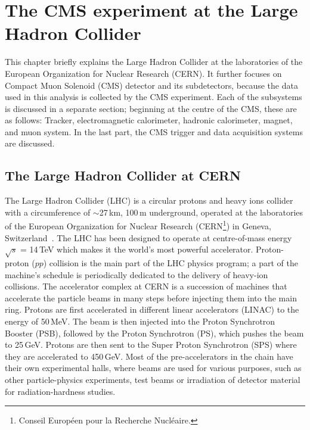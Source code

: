 \graphicspath{{chapt_dutch/}{intro/}{chapt2/}{chapt3/}{chapt4/}{chapt5/}{chapt6/}{chapt7/}{chapt8/}}

\renewcommand\evenpagerightmark{{\scshape\small Chapter 3}}
\renewcommand\oddpageleftmark{{\scshape\small LHC and the CMS Experiment}}

\renewcommand{\bibname}{References}

\hyphenation{}

\chapter[The CMS experiment at the Large Hadron Collider]%
{The CMS experiment at the Large Hadron Collider}
\label{chapt:lhc}
This chapter briefly explains the Large Hadron Collider at the laboratories of the European Organization for Nuclear Research (CERN). It further focuses on Compact Muon Solenoid (CMS) detector and its subdetectors, because the data used in this analysis is collected by the CMS experiment. Each of the subsystems is discussed in a separate section; beginning at the centre of the CMS, these are as follows: Tracker, electromagnetic calorimeter, hadronic calorimeter, magnet, and muon system. In the last part, the CMS trigger and data acquisition systems are discussed.
\section{The Large Hadron Collider at CERN}
\label{sec:lhc}
The Large Hadron Collider (LHC) is a circular protons and heavy ions collider with a circumference of $\sim$27\,km, 100\,m underground, operated at the laboratories of the European Organization for Nuclear Research (CERN\footnote {Conseil Européen pour la Recherche Nucléaire.}) in Geneva, Switzerland~\cite{Bruning:lhc}. The LHC has been designed to operate at centre-of-mass energy $\sqrt{s}$ = 14\,TeV which makes it the world's most powerful accelerator. Proton-proton ($pp$) collision is the main part of the LHC physics program; a part of the machine’s schedule is periodically dedicated to the delivery of heavy-ion collisions. The accelerator complex at CERN is a succession of machines that accelerate the particle beams in many steps before injecting them into the main ring. Protons are first accelerated in different linear accelerators (LINAC) to the energy of 50\,MeV. The beam is then injected into the Proton Synchrotron Booster (PSB), followed by the Proton Synchrotron (PS), which pushes the beam to 25\,GeV. Protons are then sent to the Super Proton Synchrotron (SPS) where they are accelerated to 450\,GeV. Most of the pre-accelerators in the chain have their own experimental halls, where beams are used for various purposes, such as other particle-physics experiments, test beams or irradiation of detector material for radiation-hardness studies.

